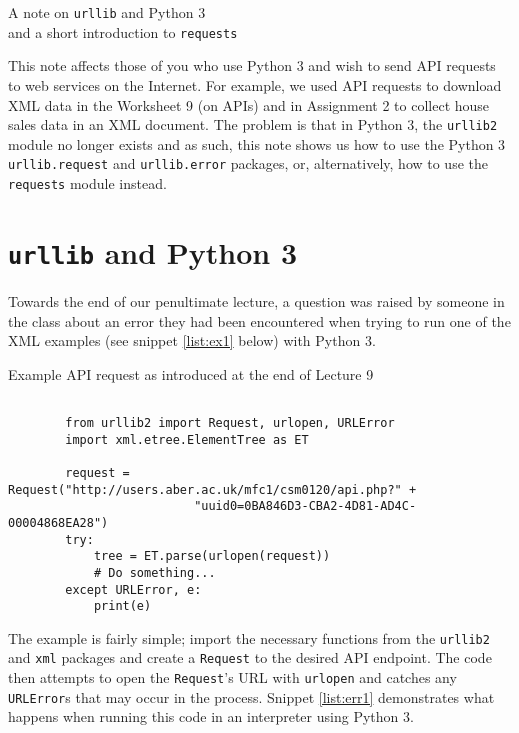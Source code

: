 \documentclass[a4paper]{article}
\begin{document}
\begin{center}
    {\huge{A note on \texttt{urllib} and Python 3}}\\
    {\LARGE{and a short introduction to \texttt{requests}}}
\noindent\makebox[\linewidth]{\rule{\paperwidth}{0.4pt}}
\end{center}

\vskip 0.5cm

This note affects those of you who use Python 3 and wish to send API
requests to web services on the Internet. For example, we used API
requests to download XML data in the Worksheet 9 (on APIs)
and in Assignment 2 to collect house sales data in an XML document. The
problem is that in Python 3, the \texttt{urllib2} module no longer exists and
as such, this note shows us how to use the Python 3 \texttt{urllib.request} and
\texttt{urllib.error} packages, or, alternatively, how to use the \texttt{requests}
module instead.

\section*{\texttt{urllib} and Python 3}

Towards the end of our penultimate lecture, a question was raised by someone in
the class about an error they had been encountered when trying to run one of the
XML examples (see snippet \ref{list:ex1} below) with Python 3.

\begin{listing}[H]
    \caption[]{Example API request as introduced at the end of Lecture 9}
    \label{list:ex1}
    \begin{verbatim}

        from urllib2 import Request, urlopen, URLError
        import xml.etree.ElementTree as ET

        request = Request("http://users.aber.ac.uk/mfc1/csm0120/api.php?" +
                          "uuid0=0BA846D3-CBA2-4D81-AD4C-00004868EA28")
        try:
            tree = ET.parse(urlopen(request))
            # Do something...
        except URLError, e:
            print(e)

    \end{verbatim}
\end{listing}

The example is fairly simple; import the necessary functions from the \texttt{urllib2}
and \texttt{xml} packages and create a \texttt{Request} to the desired API endpoint. The code
then attempts to open the \texttt{Request}'s URL with \texttt{urlopen} and
catches any \texttt{URLError}s that may occur in the process. Snippet \ref{list:err1}
demonstrates what happens when running this code in an interpreter using Python 3.
\end{document}

